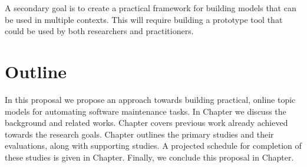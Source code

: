 A secondary goal is to create a practical framework for building models
that can be used in multiple contexts. This will require building a
prototype tool that could be used by both researchers and practitioners.

\section{Outline}\label{outline}

In this proposal we propose an approach towards building practical,
online topic models for automating software maintenance tasks. In
Chapter we discuss the background and related works.
Chapter covers previous work already achieved towards
the research goals. Chapter outlines the primary
studies and their evaluations, along with supporting studies. A
projected schedule for completion of these studies is given in
Chapter. Finally, we conclude this proposal in
Chapter.
